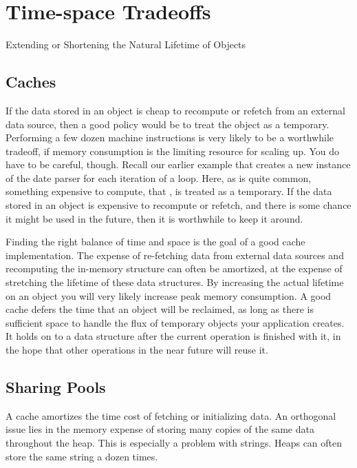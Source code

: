 \section{Time-space Tradeoffs}
\label{sec:time-space-tradeoffs}

Extending or Shortening the Natural Lifetime of Objects


\subsection{Caches}
\label{sec:caches}

If the data stored in an object is cheap to recompute or refetch from an
external data source, then a good policy would be to treat the object as a
temporary. Performing a few dozen machine instructions is very likely to be a
worthwhile tradeoff, if memory consumption is the limiting resource for
scaling up. 
You do have to be careful, though. Recall our earlier example that creates a new
instance of the date parser  for each iteration of a
loop. Here, as is quite common, something expensive to compute, that
, is treated as a temporary. If the data stored in an
object is expensive to recompute or refetch, and there is some chance it might
be used in the future, then it is worthwhile to keep it around.

Finding the right balance of time and space is the goal of a good cache
implementation. The expense of re-fetching data from external data sources and
recomputing the in-memory structure can often be amortized, at the expense of
stretching the lifetime of these data structures. By increasing the actual
lifetime on an object you will very likely increase peak memory consumption. A
good cache defers the time that an object will be reclaimed, as long as there is
sufficient space to handle the flux of temporary objects your application
creates. It holds on to a data structure after the current operation is finished
with it, in the hope that other operations in the near future will reuse it.

\subsection{Sharing Pools}
\label{sec:sharing-pools}

A cache amortizes the time cost of fetching or initializing data. An orthogonal
issue lies in the memory expense of storing many copies of the same data
throughout the heap. This is especially a problem with strings. Heaps can often
store the same string a dozen times.

